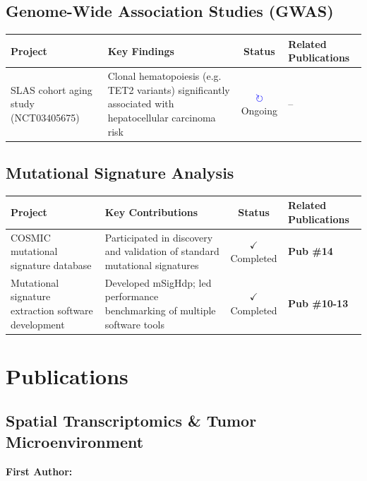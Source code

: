 \documentclass[11pt,a4paper]{article}
\begin{document}
\subsection*{Genome-Wide Association Studies (GWAS)}

\begin{longtable}{p{5cm}p{5cm}cp{2cm}}
\toprule
\textbf{Project} & \textbf{Key Findings} & \textbf{Status} & \textbf{Related Publications} \\
\midrule
SLAS cohort aging study (NCT03405675) & Clonal hematopoiesis (e.g. TET2 variants) significantly associated with hepatocellular carcinoma risk & \textcolor{blue}{$\circlearrowright$} Ongoing & -- \\
\bottomrule
\end{longtable}

\subsection*{Mutational Signature Analysis}

\begin{longtable}{p{5cm}p{5cm}cp{2cm}}
\toprule
\textbf{Project} & \textbf{Key Contributions} & \textbf{Status} & \textbf{Related Publications} \\
\midrule
COSMIC mutational signature database & Participated in discovery and validation of standard mutational signatures & $\checkmark$ Completed & \textbf{Pub \#14} \\
Mutational signature extraction software development & Developed mSigHdp; led performance benchmarking of multiple software tools & $\checkmark$ Completed & \textbf{Pub \#10-13} \\
\bottomrule
\end{longtable}

\section*{Publications}

\subsection*{Spatial Transcriptomics \& Tumor Microenvironment}

\textbf{First Author:}
\end{document}
